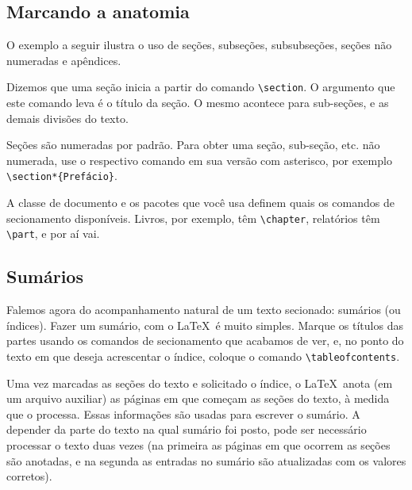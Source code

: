 \subsection{Marcando a anatomia}\label{sec:comandos-de-secionamento}

O exemplo a seguir ilustra o uso de seções, subseções, subsubseções, seções não numeradas e apêndices.


\medskip
{\footnotesize}

\medskip

Dizemos que uma seção inicia a partir do comando \verb'\section'. O
argumento que este comando leva é o título da seção. O mesmo acontece
para sub-seções, e as demais divisões do texto.

Seções são numeradas por padrão. Para obter uma seção, sub-seção, etc. não numerada,
use o respectivo comando em sua versão com asterisco, por
exemplo \verb'\section*{Prefácio}'.

A classe de documento e os pacotes que você usa definem quais os
comandos de secionamento disponíveis. Livros, por exemplo, têm
\verb'\chapter', relatórios têm \verb'\part', e por aí vai.

\subsection{Sumários}

Falemos agora do acompanhamento natural de um texto secionado:
sumários (ou índices). Fazer um sumário, com o
\LaTeX\ é muito simples. Marque os títulos das partes usando os comandos de
secionamento que acabamos de ver, e, no ponto do texto em que deseja
acrescentar o índice, coloque o comando \verb'\tableofcontents'.

Uma vez marcadas as seções do texto e solicitado o índice, o
\LaTeX\ anota (em um arquivo auxiliar) as páginas em que começam as
seções do texto, à medida que o processa. Essas informações
são usadas para escrever o sumário. A depender da parte do
texto na qual sumário foi posto, pode ser necessário processar o texto duas
vezes (na primeira as páginas em que ocorrem as seções são anotadas, e
na segunda as entradas no sumário são atualizadas com os valores
corretos).

